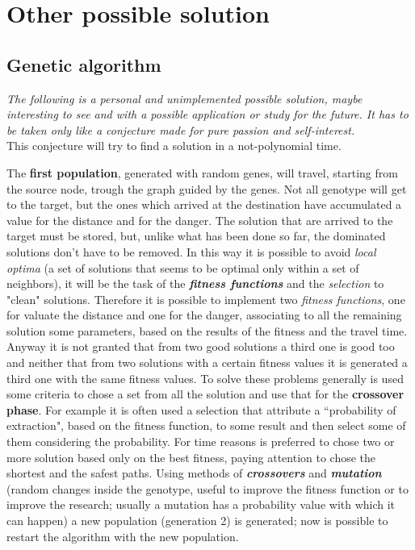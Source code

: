 \documentclass[a4paper,11pt]{report}
\begin{document}
\section{Other possible solution}
\subsection*{Genetic algorithm}
\textit{The following is a personal and unimplemented possible solution, maybe interesting to see and with a possible application or study for the future.
It has to be taken only like a conjecture made for pure passion and self-interest.}
\vspace{10mm}\\
This conjecture will try to find a solution in a not-polynomial time.

The \textbf{first population}, generated with random genes, will travel, starting from the source node, trough the graph guided by the genes. Not all genotype will get to the target, but the ones which arrived at the destination have accumulated a value for the distance and for the danger.
The solution that are arrived to the target must be stored, but, unlike what has been done so far, the dominated solutions don't have to be removed. In this way it is possible to avoid \textit{local optima} (a set of solutions that seems to be optimal only within a set of neighbors), it will be the task of the \textit{\textbf{fitness functions}} and the \textit{selection} to "clean" solutions. 
Therefore it is possible to implement two \textit{fitness functions}, one for valuate the distance and one for the danger, associating to all the remaining solution some parameters, based on the results of the fitness and the travel time.
Anyway it is not granted that from two good solutions a third one is good too and neither that from two solutions with a certain fitness values it is generated a third one with the same fitness values. To solve these problems generally is used some criteria to chose a set from all the solution and use that for the \textbf{crossover phase}.
For example it is often used a selection that attribute a ``probability of extraction", based on the fitness function, to some result and then select some of them considering the probability.
For time reasons is preferred to chose two or more solution based only on the best fitness, paying attention to chose the shortest and the safest paths.
Using methods of \textbf{\textit{crossovers}} and \textbf{\textit{mutation}} (random changes inside the genotype, useful to improve the fitness function or to improve the research; usually a mutation has a probability value with which it can happen) a new population (generation 2) is generated; now is possible to restart the algorithm with the new population. 
\end{document}
